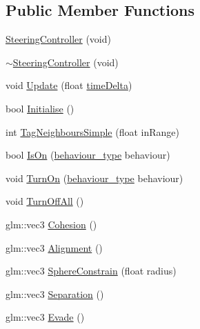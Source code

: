 \subsection*{Public Member Functions}
\begin{DoxyCompactItemize}
\item 
\hyperlink{class_b_g_e_1_1_steering_controller_a7510d7b82370619001ee140f28578cb8}{Steering\-Controller} (void)
\item 
\hyperlink{class_b_g_e_1_1_steering_controller_a4e7e26c5d658d948ad58bcc1965e933a}{$\sim$\-Steering\-Controller} (void)
\item 
void \hyperlink{class_b_g_e_1_1_steering_controller_aa0a6fdb7b154d020255e689bae13e592}{Update} (float \hyperlink{class_b_g_e_1_1_steering_controller_a2663615d3340930be34a999daa7f735b}{time\-Delta})
\item 
bool \hyperlink{class_b_g_e_1_1_steering_controller_ae301df857ee41719ec16cca2b2b28679}{Initialise} ()
\item 
int \hyperlink{class_b_g_e_1_1_steering_controller_a5ae58ceaa5f18ea630088ac58ccd4b88}{Tag\-Neighbours\-Simple} (float in\-Range)
\item 
bool \hyperlink{class_b_g_e_1_1_steering_controller_aaff1c52abd1ac49e78290dbb6ca56d22}{Is\-On} (\hyperlink{class_b_g_e_1_1_steering_controller_abebc62a28e58ef3c7fc189941629aa53}{behaviour\-\_\-type} behaviour)
\item 
void \hyperlink{class_b_g_e_1_1_steering_controller_abcbf615812426ee099ea811990395201}{Turn\-On} (\hyperlink{class_b_g_e_1_1_steering_controller_abebc62a28e58ef3c7fc189941629aa53}{behaviour\-\_\-type} behaviour)
\item 
void \hyperlink{class_b_g_e_1_1_steering_controller_af250dbbe972602fc150e3c2b5ec8d72b}{Turn\-Off\-All} ()
\item 
glm\-::vec3 \hyperlink{class_b_g_e_1_1_steering_controller_ab9e88d733741f192af1ac5ed4a919fc1}{Cohesion} ()
\item 
glm\-::vec3 \hyperlink{class_b_g_e_1_1_steering_controller_a68974d7ec67c5a08c85548f2ad976b17}{Alignment} ()
\item 
glm\-::vec3 \hyperlink{class_b_g_e_1_1_steering_controller_a66ff5fe4067c564e08dc24e9da8607fc}{Sphere\-Constrain} (float radius)
\item 
glm\-::vec3 \hyperlink{class_b_g_e_1_1_steering_controller_a1e64a7cddc10acab2984540ae53abda7}{Separation} ()
\item 
glm\-::vec3 \hyperlink{class_b_g_e_1_1_steering_controller_aeb0c96ab4bda50df835b22a1c750e998}{Evade} ()

\end{DoxyCompactItemize}
